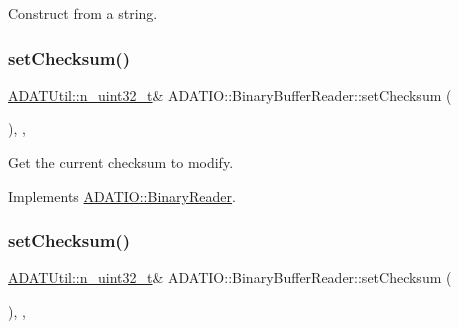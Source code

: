 Construct from a string. 

\mbox{\label{classADATIO_1_1BinaryBufferReader_a3976e5ece3392d04158307f864a84bb7}} 
\subsubsection{\texorpdfstring{setChecksum()}{setChecksum()}\hspace{0.1cm}{\footnotesize\ttfamily [1/2]}}
{\footnotesize\ttfamily \mbox{\hyperlink{namespaceADATUtil_ad945a8afa4db2d1f89b731964adae97e}{A\+D\+A\+T\+Util\+::n\+\_\+uint32\+\_\+t}}\& A\+D\+A\+T\+I\+O\+::\+Binary\+Buffer\+Reader\+::set\+Checksum (\begin{DoxyParamCaption}{ }\end{DoxyParamCaption})\hspace{0.3cm}{\ttfamily [inline]}, {\ttfamily [protected]}, {\ttfamily [virtual]}}



Get the current checksum to modify. 



Implements \mbox{\hyperlink{classADATIO_1_1BinaryReader_a33d291f073bf2e1f71f6bdbe40ce343a}{A\+D\+A\+T\+I\+O\+::\+Binary\+Reader}}.

\mbox{\label{classADATIO_1_1BinaryBufferReader_a3976e5ece3392d04158307f864a84bb7}} 
\subsubsection{\texorpdfstring{setChecksum()}{setChecksum()}\hspace{0.1cm}{\footnotesize\ttfamily [2/2]}}
{\footnotesize\ttfamily \mbox{\hyperlink{namespaceADATUtil_ad945a8afa4db2d1f89b731964adae97e}{A\+D\+A\+T\+Util\+::n\+\_\+uint32\+\_\+t}}\& A\+D\+A\+T\+I\+O\+::\+Binary\+Buffer\+Reader\+::set\+Checksum (\begin{DoxyParamCaption}{ }\end{DoxyParamCaption})\hspace{0.3cm}{\ttfamily [inline]}, {\ttfamily [protected]}, {\ttfamily [virtual]}}



